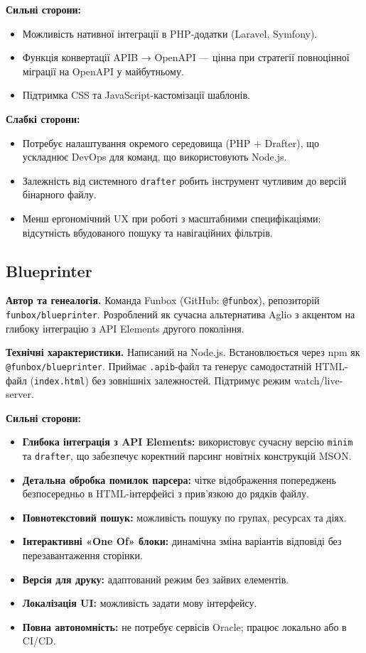 \documentclass{article}
\begin{document}
\textbf{Сильні сторони:}
\begin{itemize}
\item Можливість нативної інтеграції в PHP-додатки (Laravel, Symfony).
\item Функція конвертації APIB → OpenAPI — цінна при стратегії повноцінної міграції на OpenAPI у майбутньому.
\item Підтримка CSS та JavaScript-кастомізації шаблонів.
\end{itemize}

\textbf{Слабкі сторони:}
\begin{itemize}
\item Потребує налаштування окремого середовища (PHP + Drafter), що ускладнює DevOps для команд, що використовують Node.js.
\item Залежність від системного \texttt{drafter} робить інструмент чутливим до версій бінарного файлу.
\item Менш ергономічний UX при роботі з масштабними специфікаціями: відсутність вбудованого пошуку та навігаційних фільтрів.
\end{itemize}

\subsection{Blueprinter}
\textbf{Автор та генеалогія.} Команда Funbox (GitHub: \texttt{@funbox}), репозиторій \texttt{funbox/blueprinter}. Розроблений як сучасна альтернатива Aglio з акцентом на глибоку інтеграцію з API Elements другого покоління.

\textbf{Технічні характеристики.} Написаний на Node.js. Встановлюється через npm як \texttt{@funbox/blueprinter}. Приймає \texttt{.apib}-файл та генерує самодостатній HTML-файл (\texttt{index.html}) без зовнішніх залежностей. Підтримує режим watch/live-server.

\textbf{Сильні сторони:}
\begin{itemize}
\item \textbf{Глибока інтеграція з API Elements:} використовує сучасну версію \texttt{minim} та \texttt{drafter}, що забезпечує коректний парсинг новітніх конструкцій MSON.
\item \textbf{Детальна обробка помилок парсера:} чітке відображення попереджень безпосередньо в HTML-інтерфейсі з прив'язкою до рядків файлу.
\item \textbf{Повнотекстовий пошук:} можливість пошуку по групах, ресурсах та діях.
\item \textbf{Інтерактивні «One Of» блоки:} динамічна зміна варіантів відповіді без перезавантаження сторінки.
\item \textbf{Версія для друку:} адаптований режим без зайвих елементів.
\item \textbf{Локалізація UI:} можливість задати мову інтерфейсу.
\item \textbf{Повна автономність:} не потребує сервісів Oracle; працює локально або в CI/CD.
\end{itemize}
\end{document}
